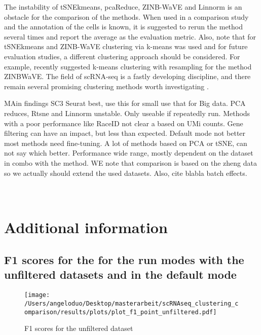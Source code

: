\documentclass[12pt, a4paper]{article}\usepackage[]{graphicx}\usepackage[]{color}
\begin{document}
The instability of tSNEkmeans, pcaReduce, ZINB-WaVE and Linnorm is an obstacle for the comparison of the methods. When used in a comparison study and the annotation of the cells is known,  it is suggested to rerun the method several times and report the average as the evaluation metric.  Also, note that for tSNEkmeans and ZINB-WaVE clustering via k-means was used and for future evaluation studies, a different clustering approach should be considered. For example, \citet{perraudeau2017bioconductor} recently suggested k-means clustering with resampling for the method ZINBWaVE. The field of scRNA-seq is a fastly developing discipline, and there remain several promising clustering methods worth investigating \citep{ van2017magic, sinha2018dropclust, sun2017dimm, yang2017safe}.

MAin findings SC3 Seurat best, use this for small use that for Big data. PCA reduces, Rtsne and Linnorm unstable. Only useable if repeatedly run. Methods with a poor performance like RaceID not clear a based on UMi counts. Gene filtering can have an impact, but less than expected.  Default mode not better most methods need fine-tuning. A lot of methods based on PCA or tSNE, can not say which better. Performance wide range, mostly dependent on the dataset in combo with the method.
WE note that comparison is based on the zheng data so we actually should extend the used datasets. Also, cite blabla batch effects. 

\clearpage


\clearpage

\appendix 
\section{\\Additional information}
\subsection{F1 scores for the for the run modes with the unfiltered datasets and in the default mode}
\begin{figure}[H]
\centering
\texttt{[image: /Users/angeloduo/Desktop/masterarbeit/scRNAseq\_clustering\_comparison/results/plots/plot\_f1\_point\_unfiltered.pdf]}
\caption{F1 scores for the unfiltered dataset }
\label{fig:f1pointunf}
\end{figure}
\end{document}
